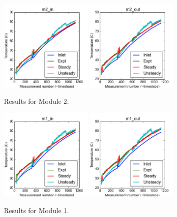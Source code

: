 \documentclass{article}
\begin{document}
\clearpage
\begin{figure}[!ht]
\centering
\includegraphics[width=0.4\textwidth]{../../data/ICSolar/images/Feb27_m2_in_compare.png}\hspace{0.05\textwidth}
\includegraphics[width=0.4\textwidth]{../../data/ICSolar/images/Feb27_m2_out_compare.png}\hspace{0.05\textwidth}\\
\caption{Results for Module 2.}\end{figure}
\begin{figure}[!ht]
\centering
\includegraphics[width=0.4\textwidth]{../../data/ICSolar/images/Feb27_m1_in_compare.png}\hspace{0.05\textwidth}
\includegraphics[width=0.4\textwidth]{../../data/ICSolar/images/Feb27_m1_out_compare.png}\hspace{0.05\textwidth}\\
\caption{Results for Module 1.}\end{figure}
\end{document}
